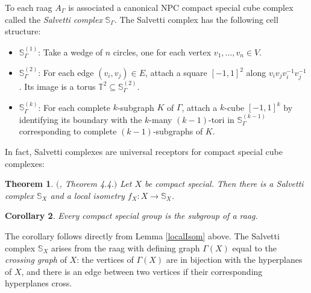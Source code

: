 \documentclass[11pt]{amsart}
\newtheorem{thm}{Theorem}
\numberwithin{thm}{section}
\newtheorem{corollary}[thm]{Corollary}
\theoremstyle{remark}
\theoremstyle{definition}
\newcommand{\T}{\mathbb{T}}
\newcommand{\Sa}{\mathbb{S}}
\begin{document}
To each raag $A_\Gamma$ is associated a canonical NPC compact special cube complex called the \emph{Salvetti complex} $\Sa_\Gamma$. The Salvetti complex has the following cell structure:
\begin{itemize}
\item $\Sa_\Gamma^{(1)}$: Take a wedge of $n$ circles, one for each vertex $v_1,\ldots, v_n\in V$.
\item $\Sa_\Gamma^{(2)}$: For each edge $(v_i,v_j)\in E$, attach a square $[-1,1]^2$ along $v_iv_jv_i^{-1}v_j^{-1}$.  Its image is a torus $\T^2\subseteq \Sa_\Gamma^{(2)}$.
\item $\Sa_\Gamma^{(k)}$: For each complete $k$-subgraph $K$ of $\Gamma$, attach a $k$-cube $[-1,1]^k$ by identifying its boundary with the $k$-many $(k-1)$-tori in $\Sa_\Gamma^{(k-1)}$ corresponding to complete $(k-1)$-subgraphs of $K$.
\end{itemize}
\noindent
In fact, Salvetti complexes are universal receptors for compact special cube complexes:
\begin{thm} \label{embedSal}$($\cite{Wise12}, Theorem 4.4.$)$ Let $X$ be compact special.  Then there is a Salvetti complex $\Sa_X$ and a local isometry $f_X:X\rightarrow \Sa_X$.  
\end{thm}
\begin{corollary} Every compact special group is the subgroup of a raag.  
\end{corollary}
The corollary follows directly from Lemma \ref{localIsom} above.  The Salvetti complex $\Sa_X$ arises from the raag with defining graph $\Gamma(X)$ equal to the \emph{crossing graph} of $X$:  the vertices of $\Gamma(X)$ are in bijection with the hyperplanes of $X$, and there is an edge between two vertices if their corresponding hyperplanes cross.  

%
%
%
%
\end{document}
